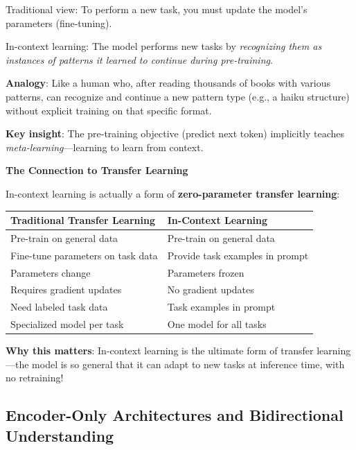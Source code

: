 \documentclass{article}
\begin{document}
\begin{tcolorbox}[colback=yellow!5!white, colframe=orange!50!black, title=Why In-Context Learning is Remarkable]
Traditional view: To perform a new task, you must update the model's parameters (fine-tuning).

In-context learning: The model performs new tasks by \textit{recognizing them as instances of patterns it learned to continue during pre-training}.

\textbf{Analogy}: Like a human who, after reading thousands of books with various patterns, can recognize and continue a new pattern type (e.g., a haiku structure) without explicit training on that specific format.

\textbf{Key insight}: The pre-training objective (predict next token) implicitly teaches \textit{meta-learning}---learning to learn from context.
\end{tcolorbox}

\textbf{The Connection to Transfer Learning}

In-context learning is actually a form of \textbf{zero-parameter transfer learning}:

\begin{center}
\begin{tabular}{p{5cm}p{5cm}}
\toprule
\textbf{Traditional Transfer Learning} & \textbf{In-Context Learning} \\
\midrule
Pre-train on general data & Pre-train on general data \\
\midrule
Fine-tune parameters on task data & Provide task examples in prompt \\
\midrule
Parameters change & Parameters frozen \\
\midrule
Requires gradient updates & No gradient updates \\
\midrule
Need labeled task data & Task examples in prompt \\
\midrule
Specialized model per task & One model for all tasks \\
\bottomrule
\end{tabular}
\end{center}

\textbf{Why this matters}: In-context learning is the ultimate form of transfer learning---the model is so general that it can adapt to new tasks at inference time, with no retraining!

\subsection{Encoder-Only Architectures and Bidirectional Understanding}
\end{document}
